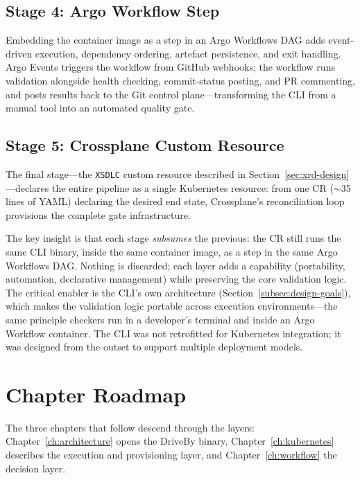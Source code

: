 \subsection{Stage 4: Argo Workflow Step}
\label{subsec:stage-workflow}

Embedding the container image as a step in an Argo Workflows DAG adds event-driven execution, dependency ordering, artefact persistence, and exit handling. Argo Events triggers the workflow from GitHub webhooks; the workflow runs validation alongside health checking, commit-status posting, and PR commenting, and posts results back to the Git control plane---transforming the CLI from a manual tool into an automated quality gate.

\subsection{Stage 5: Crossplane Custom Resource}
\label{subsec:stage-cr}

The final stage---the \texttt{XSDLC} custom resource described in Section~\ref{sec:xrd-design}---declares the entire pipeline as a single Kubernetes resource: from one CR (\(\sim\)35 lines of YAML) declaring the desired end state, Crossplane's reconciliation loop provisions the complete gate infrastructure.

The key insight is that each stage \textit{subsumes} the previous: the CR still runs the same CLI binary, inside the same container image, as a step in the same Argo Workflows DAG. Nothing is discarded; each layer adds a capability (portability, automation, declarative management) while preserving the core validation logic. The critical enabler is the CLI's own architecture (Section~\ref{subsec:design-goals}), which makes the validation logic portable across execution environments---the same principle checkers run in a developer's terminal and inside an Argo Workflow container. The CLI was not retrofitted for Kubernetes integration; it was designed from the outset to support multiple deployment models.

\section{Chapter Roadmap}
\label{sec:architecture-roadmap}

The three chapters that follow descend through the layers: Chapter~\ref{ch:architecture} opens the DriveBy binary, Chapter~\ref{ch:kubernetes} describes the execution and provisioning layer, and Chapter~\ref{ch:workflow} the decision layer.

